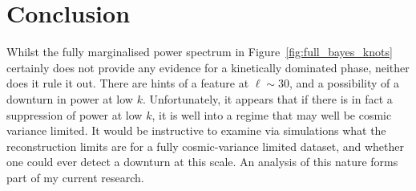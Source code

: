 \section{Conclusion}
Whilst the fully marginalised power spectrum in Figure~\ref{fig:full_bayes_knots} certainly does not provide any evidence for a kinetically dominated phase, neither does it rule it out. There are hints of a feature at \(\ell\sim30\), and a possibility of a downturn in power at low \(k\). Unfortunately, it appears that if there is in fact a suppression of power at low \(k\), it is well into a regime that may well be cosmic variance limited. It would be instructive to examine via simulations what the reconstruction limits are for a fully cosmic-variance limited dataset, and whether one could ever detect a downturn at this scale. An analysis of this nature forms part of my current research.

